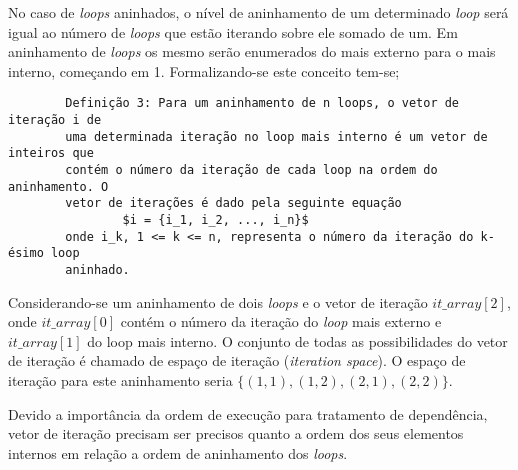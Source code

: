 No caso de \textit{loops} aninhados, o nível de aninhamento de um determinado 
\textit{loop} será igual ao número de \textit{loops} que estão iterando sobre
ele somado de um. Em aninhamento de \textit{loops} os mesmo serão enumerados do
mais externo para o mais interno, começando em 1. Formalizando-se este conceito
tem-se;

\begin{verbatim}
        Definição 3: Para um aninhamento de n loops, o vetor de iteração i de
        uma determinada iteração no loop mais interno é um vetor de inteiros que
        contém o número da iteração de cada loop na ordem do aninhamento. O
        vetor de iterações é dado pela seguinte equação
                $i = {i_1, i_2, ..., i_n}$
        onde i_k, 1 <= k <= n, representa o número da iteração do k-ésimo loop
        aninhado.
\end{verbatim}

Considerando-se um aninhamento de dois \textit{loops} e o vetor de iteração
$it\_array[2]$, onde $it\_array[0]$ contém o número da iteração do \textit{loop}
mais externo e $it\_array[1]$ do loop mais interno. 
O conjunto de todas as possibilidades do vetor de iteração é chamado de espaço 
de iteração (\textit{iteration space}). 
O espaço de iteração para este aninhamento seria $\{(1,1),(1,2),(2,1),(2,2)\}$.

Devido a importância da ordem de execução para tratamento de dependência,
vetor de iteração precisam ser precisos quanto a ordem dos seus elementos
internos em relação a ordem de aninhamento dos \textit{loops}. 










